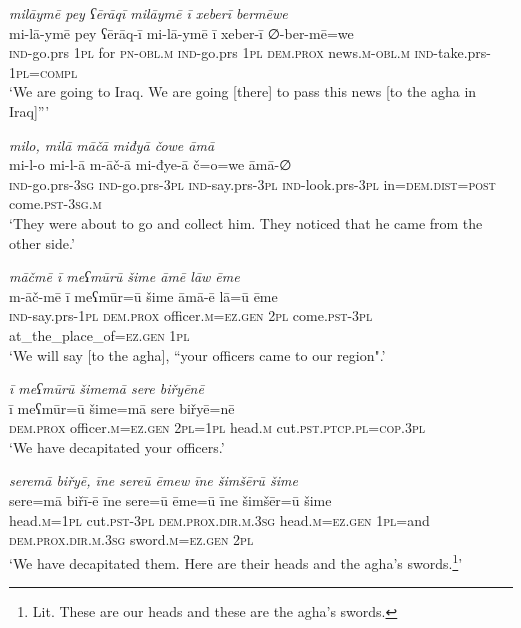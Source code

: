 \ea \label{BP.79}
\textit{milāymē pey ʕērāqī milāymē ī xeberī bermēwe} \\ 
\gll mi-lā-ymē pey ʕērāq-ī mi-lā-ymē ī xeber-ī ∅-ber-mē=we \\ 
 \textsc{ind-}go.prs \textsc{1pl} for \textsc{pn}\textsc{-obl}\textsc{.m} \textsc{ind-}go.prs \textsc{1pl} \textsc{dem.prox} news\textsc{.m}\textsc{-obl}\textsc{.m} \textsc{ind-}take.prs\textsc{-\textsc{1pl}}\textsc{=compl} \\ 
\glt `We are going to Iraq. We are going [there] to pass this news [to the agha in Iraq]”'
\z 
 
\ea \label{BP.80}
\textit{milo, milā māčā miđyā čowe āmā} \\ 
\gll mi-l-o mi-l-ā m-āč-ā mi-đye-ā č=o=we āmā-∅ \\ 
 \textsc{ind-}go.prs\textsc{-3sg} \textsc{ind-}go.prs\textsc{-3pl} \textsc{ind-}say.prs\textsc{-3pl} \textsc{ind-}look.prs\textsc{-3pl} in=\textsc{dem.dist}\textsc{=\textsc{post}} come\textsc{.pst}\textsc{-3sg}\textsc{.m} \\ 
\glt `They were about to go and collect him. They noticed that he came from the other side.'
\z 
 
\ea \label{BP.90}
\textit{māčmē ī meʕmūrū šime āmē lāw ēme} \\ 
\gll m-āč-mē ī meʕmūr=ū šime āmā-ē lā=ū ēme \\ 
 \textsc{ind-}say.prs\textsc{-\textsc{1pl}} \textsc{dem.prox} officer\textsc{.m}\textsc{=ez.gen} \textsc{2pl} come\textsc{.pst}\textsc{-3pl} at\_the\_place\_of\textsc{=ez.gen} \textsc{1pl} \\ 
\glt `We will say [to the agha], “your officers came to our region".'
\z 
 
\ea \label{BP.96}
\textit{ī meʕmūrū šimemā sere biřyēnē} \\ 
\gll ī meʕmūr=ū šime=mā sere biřyē=nē \\ 
 \textsc{dem.prox} officer\textsc{.m}\textsc{=ez.gen} \textsc{2pl}\textsc{=\textsc{1pl}} head\textsc{.m} cut\textsc{.pst}\textsc{.ptcp}\textsc{.pl}\textsc{=cop}\textsc{.3pl} \\ 
\glt `We have decapitated your officers.'
\z 
 
\ea \label{BP.97}
\textit{seremā biřyē, īne sereū ēmew īne šimšērū šime} \\ 
\gll sere=mā biřī-ē īne sere=ū ēme=ū īne šimšēr=ū šime \\ 
 head\textsc{.m}\textsc{=\textsc{1pl}} cut\textsc{.pst}\textsc{-3pl} \textsc{dem.prox}\textsc{.dir}\textsc{.m}\textsc{.3sg} head\textsc{.m}\textsc{=ez.gen} \textsc{1pl}=and \textsc{dem.prox}\textsc{.dir}\textsc{.m}\textsc{.3sg} sword\textsc{.m}\textsc{=ez.gen} \textsc{2pl} \\ 
\glt `We have decapitated them. Here are their heads and the agha’s swords.\footnote{Lit. These are our heads and these are the agha’s swords.}'
\z 
 
